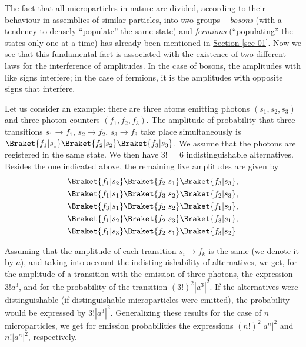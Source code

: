 \documentclass[a4paper,sfsidenotes,colorlinks=true]{tufte-book}
\numberwithin{equation}{section}
\numberwithin{figure}{section}
\begin{document}
The fact that all microparticles in nature are divided, according to
their behaviour in assemblies of similar particles, into two groups --
\emph{bosons} (with a tendency to densely ``populate'' the same state) and \emph{fermions} (``populating'' the states only one at a time) has already been mentioned in \hyperref[sec-01]{Section \ref{sec-01}}. Now we see that this fundamental fact is associated with the existence of two different laws
for the interference of amplitudes. In the case of bosons, the
amplitudes with like signs interfere; in the case of fermions, it is
the amplitudes with opposite signs that interfere.


Let us consider  an example: there are
three atoms emitting photons $(s_{1}, s_{2}, s_{3})$ and three photon
counters $(f_{1}, f_{2}, f_{3})$. The amplitude of probability that
three transitions $s_{1} \to f_{1},\, s_{2} \to f_{2}, \, s_{3} \to f_{3}$
take place simultaneously is $\Braket{f_{1}|s_{1}}
\Braket{f_{2}|s_{2}}\Braket{f_{3}|s_{3}}$. We assume that the photons
are registered in the same state. We then have 3! = 6
indistinguishable alternatives. Besides the one indicated above, the
remaining five amplitudes are given by 
\begin{equation*}%
\begin{split}
&\Braket{f_{1}|s_{2}} \Braket{f_{2}|s_{1}}\Braket{f_{3}|s_{3}},\\
&\Braket{f_{1}|s_{1}} \Braket{f_{3}|s_{2}}\Braket{f_{2}|s_{3}},\\
&\Braket{f_{3}|s_{1}} \Braket{f_{2}|s_{2}}\Braket{f_{1}|s_{3}},\\
&\Braket{f_{1}|s_{2}} \Braket{f_{2}|s_{3}}\Braket{f_{3}|s_{1}},\\
&\Braket{f_{1}|s_{3}} \Braket{f_{2}|s_{1}}\Braket{f_{3}|s_{2}}
\end{split}
\end{equation*}

Assuming that the amplitude of each transition $s_{i} \to f_{k}$ is
the same (we denote it by $a$), and taking into account the
indistinguishability of alternatives, we get, for the amplitude of a
transition with the emission of three photons, the expression $3!
a^{3}$, and for the probability of the transition $(3!)^{2}|a^{3}
|^{2}$. If the alternatives were distinguishable (if distinguishable
microparticles were emitted), the probability would be expressed by
$3! | a^{3}|^{2}$. Generalizing these results for the case of $n$
microparticles, we get for emission probabilities the expressions
$(n!)^{2} | a^{n}|^{2}$ and $n! | a^{n}|^{2}$, respectively.
\end{document}

